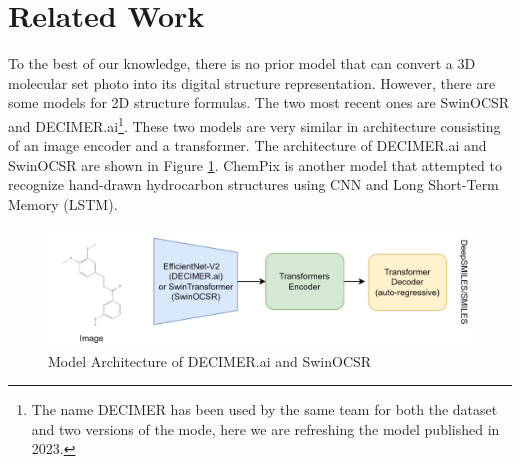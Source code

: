 \documentclass[12pt]{article}
\begin{document}
\section{Related Work}
To the best of our knowledge, there is no prior model that can convert a 3D molecular set photo into its digital structure representation. However, there are some models for 2D structure formulas. The two most recent ones are SwinOCSR\autocite{swinocsr} and DECIMER.ai\footnote{The name DECIMER has been used by the same team for both the dataset and two versions of the mode, here we are refreshing the model published in 2023.}\autocite{decimer}. These two models are very similar in architecture consisting of an image encoder and a transformer. The architecture of DECIMER.ai and SwinOCSR are shown in Figure \ref{fig:rwa}.
ChemPix is another model that attempted to recognize hand-drawn hydrocarbon structures using CNN and Long Short-Term Memory (LSTM).  

\begin{figure}
    \centering
    \includegraphics[width=\textwidth]{related_work_arch.png}
    \caption{Model Architecture of DECIMER.ai and SwinOCSR}
    \label{fig:rwa}
\end{figure}
\end{document}
